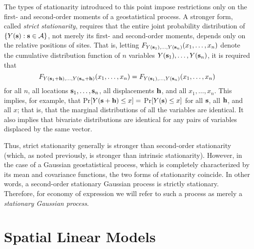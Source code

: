 The types of stationarity introduced to this point impose restrictions only on the first- and second-order moments of a geostatistical process.  A stronger form, called {\em strict stationarity}, requires that the entire joint probability distribution of $\{Y({\bf s}): {\bf s}\in {\cal A}\}$, not merely its first- and second-order moments,
depends only on the relative positions of
sites.  That is, letting $F_{Y({\bf s}_1),\ldots,Y({\bf s}_n)}(x_1,\ldots,
x_n)$ denote the cumulative distribution function of $n$ variables $Y({\bf s}_1),\ldots,Y({\bf s}_n)$, it is required that
\[
F_{Y({\bf s}_1+{\bf h}),\ldots,Y({\bf s}_n+{\bf h})}(x_1,\ldots,
x_n) 
 = F_{Y({\bf s}_1),\ldots,Y({\bf s}_n)}(x_1,\ldots,
x_n) \] 
for all $n$, all locations ${\bf s}_1,\ldots,{\bf s}_n$, all displacements ${\bf h}$, and all 
$x_1,\ldots,x_n$.  This implies, for example, that Pr$[Y({\bf s}+{\bf h})\leq x]=$
Pr$[Y({\bf s})\leq x]$ for all ${\bf s}$, all ${\bf h}$, and all $x$; that is, that the marginal distributions of all the variables are identical.  It also implies that bivariate distributions are identical for any pairs of variables displaced by the same vector.

Thus, strict stationarity generally is stronger than second-order stationarity (which, as noted previously, is stronger than intrinsic stationarity).  However, in the case of a Gaussian geostatistical process, which is completely characterized by its mean and covariance functions, the two forms of stationarity coincide.  In other words, a second-order stationary Gaussian process is strictly stationary.  Therefore, for economy of expression we will refer to such a process as merely a {\em stationary Gaussian process}.


\section{Spatial Linear Models}

